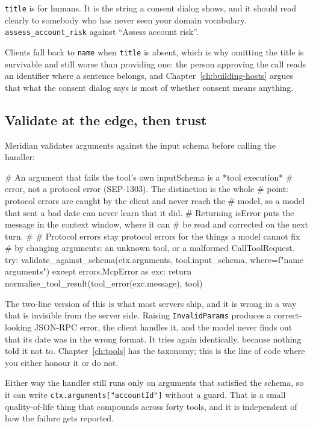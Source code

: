 \texttt{title} is for humans. It is the string a consent dialog shows, and it
should read clearly to somebody who has never seen your domain vocabulary.
\texttt{assess\_account\_risk} against ``Assess account risk''.

Clients fall back to \texttt{name} when \texttt{title} is absent, which is why
omitting the title is survivable and still worse than providing one: the person approving the call reads an identifier where a sentence belongs, and
Chapter~\ref{ch:building-hosts} argues that what the consent dialog says is
most of whether consent means anything.

\subsection{Validate at the edge, then trust}

Meridian validates arguments against the input schema before calling the
handler:

\begin{py}
    # An argument that fails the tool's own inputSchema is a *tool execution*
    # error, not a protocol error (SEP-1303). The distinction is the whole
    # point: protocol errors are caught by the client and never reach the
    # model, so a model that sent a bad date can never learn that it did.
    # Returning isError puts the message in the context window, where it can
    # be read and corrected on the next turn.
    #
    # Protocol errors stay protocol errors for the things a model cannot fix
    # by changing arguments: an unknown tool, or a malformed CallToolRequest.
    try:
        validate_against_schema(ctx.arguments, tool.input_schema,
                                where=f"{name} arguments")
    except errors.McpError as exc:
        return normalise_tool_result(tool_error(exc.message), tool)
\end{py}

The two-line version of this is what most servers ship, and it is wrong in a way
that is invisible from the server side. Raising \texttt{InvalidParams} produces
a correct-looking JSON-RPC error, the client handles it, and the model never
finds out that its date was in the wrong format. It tries again identically,
because nothing told it not to. Chapter~\ref{ch:tools} has the taxonomy; this is
the line of code where you either honour it or do not.

Either way the handler still runs only on arguments that satisfied the schema,
so it can write \texttt{ctx.arguments["accountId"]} without a guard. That is a
small quality-of-life thing that compounds across forty tools, and it is
independent of how the failure gets reported.

